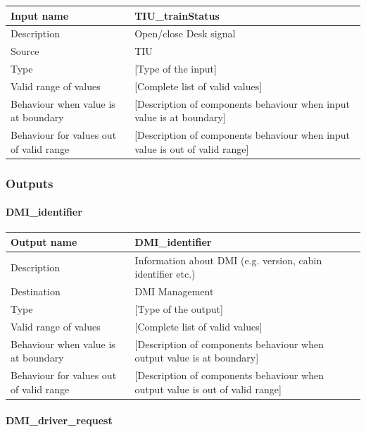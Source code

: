 \begin{longtable}{p{}p{}}
\toprule
Input name				& TIU\_trainStatus \\
\midrule
Description				& Open/close Desk signal \\
\midrule
Source					& TIU \\ 
\midrule
Type					& [Type of the input] \\
\midrule
Valid range of values	& [Complete list of valid values] \\
\midrule
Behaviour when value is at boundary	& [Description of components behaviour when input value is at boundary] \\
\midrule
Behaviour for values out of valid range	& [Description of components behaviour when input value is out of valid range] \\
\bottomrule
\end{longtable}



\subsubsection{Outputs}\label{s:DMI_outputs}

\paragraph{DMI\_identifier}

\begin{longtable}{p{}p{}}
\toprule
Output name				& DMI\_identifier \\
\midrule
Description				& Information about DMI (e.g. version, cabin identifier etc.) \\
\midrule
Destination				& DMI Management \\ 
\midrule
Type					& [Type of the output] \\
\midrule
Valid range of values	& [Complete list of valid values] \\
\midrule
Behaviour when value is at boundary	& [Description of components behaviour when output value is at boundary] \\
\midrule
Behaviour for values out of valid range	& [Description of components behaviour when output value is out of valid range] \\
\bottomrule
\end{longtable}

\paragraph{DMI\_driver\_request}

